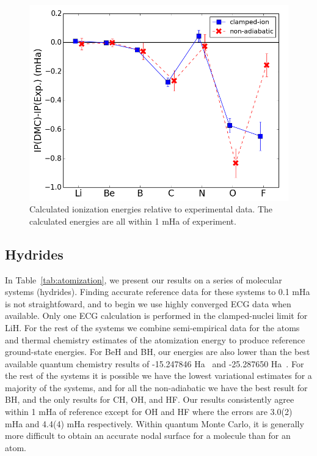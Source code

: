 \documentclass[pra,superscriptaddress,groupedaddress,twocolumn]{revtex4}
\begin{document}
\begin{figure}
\centering
\includegraphics[scale=.4]{Figures/ionization}
\caption{Calculated ionization energies relative to experimental data. The calculated energies are all within 1 mHa of experiment. \label{fig:ionization}}
\end{figure}

\subsection{Hydrides}



In Table~\ref{tab:atomization}, we present our results on a series of molecular systems (hydrides).   %
Finding accurate reference data for these systems to 0.1 mHa is not straightfoward, and to begin we use highly converged ECG data when available. Only one ECG calculation is performed in the clamped-nuclei limit for LiH. For the rest of the systems we combine semi-empirical data for the atoms~\cite{Davidson_Atoms} and thermal chemistry estimates of the atomization energy to produce reference ground-state energies. For BeH and BH, our energies are also lower than the best available quantum chemistry results of -15.247846 Ha~\cite{Koput_BeH} and -25.287650 Ha~\cite{Miliordos_BH}. For the rest of the systems it is possible we have the lowest variational estimates for a majority of the systems, and for all the non-adiabatic we have the best result for BH, and the only results for CH, OH, and HF.  Our results consistently agree within 1 mHa of reference except for OH and HF where the errors are 3.0(2) mHa and 4.4(4) mHa respectively. Within quantum Monte Carlo, it is generally more difficult to obtain an accurate nodal surface for a molecule than for an atom. %
\end{document}
